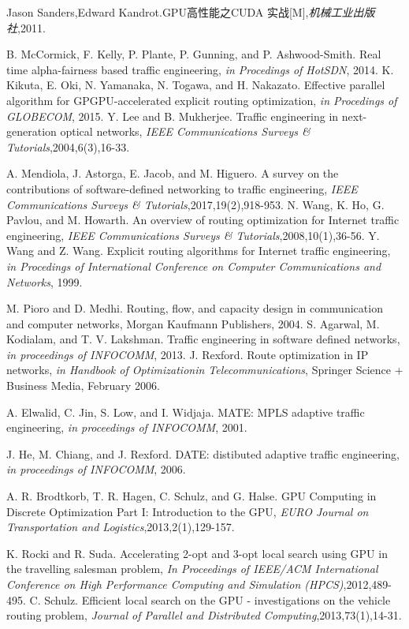 \documentclass[master]{thesis-uestc}
\begin{document}
\begin{thebibliography}{1}
Jason Sanders,Edward Kandrot.GPU高性能之CUDA 实战[M],\emph{机械工业出版社},2011.

B. McCormick, F. Kelly, P. Plante, P. Gunning, and P. Ashwood-Smith. Real time alpha-fairness based traffic engineering, \emph{in Procedings of HotSDN}, 2014.
K. Kikuta, E. Oki, N. Yamanaka, N. Togawa, and H. Nakazato. Effective parallel algorithm for GPGPU-accelerated explicit routing optimization, \emph{in Procedings of GLOBECOM}, 2015.
Y. Lee and B. Mukherjee. Traffic engineering in next-generation optical networks, \emph{IEEE Communications Surveys \& Tutorials},2004,6(3),16-33.

A. Mendiola, J. Astorga, E. Jacob, and M. Higuero. A survey on the contributions of software-defined networking to traffic engineering, \emph{IEEE Communications Surveys \& Tutorials},2017,19(2),918-953.
N. Wang, K. Ho, G. Pavlou, and M. Howarth. An overview of routing optimization for Internet traffic engineering, \emph{IEEE Communications Surveys \& Tutorials},2008,10(1),36-56.
Y. Wang and Z. Wang. Explicit routing algorithms for Internet traffic engineering, \emph{in Procedings of International Conference on Computer Communications and Networks}, 1999.

M. Pioro and D. Medhi. Routing, flow, and capacity design in communication and computer networks, Morgan Kaufmann Publishers, 2004.
S. Agarwal, M. Kodialam, and T. V. Lakshman. Traffic engineering in software defined networks, \emph{in proceedings of INFOCOMM}, 2013.
J. Rexford. Route optimization in IP networks, \emph{in Handbook of Optimizationin Telecommunications}, Springer Science + Business Media, February 2006.

A. Elwalid, C. Jin, S. Low, and I. Widjaja. MATE: MPLS adaptive traffic engineering, \emph{in proceedings of INFOCOMM}, 2001.

J. He, M. Chiang, and J. Rexford. DATE: distibuted adaptive traffic engineering, \emph{in proceedings of INFOCOMM}, 2006.

A. R. Brodtkorb, T. R. Hagen, C. Schulz, and G. Halse. GPU Computing in Discrete Optimization Part I: Introduction to the GPU, \emph{EURO Journal on Transportation and Logistics},2013,2(1),129-157.

K. Rocki and R. Suda. Accelerating 2-opt and 3-opt local search using GPU in the travelling salesman problem, \emph{In Proceedings of IEEE/ACM International Conference on High Performance Computing
and Simulation (HPCS)},2012,489-495.
C. Schulz. Efficient local search on the GPU - investigations on the vehicle routing problem, \emph{Journal of Parallel and Distributed Computing},2013,73(1),14-31.


\end{thebibliography}
\end{document}
